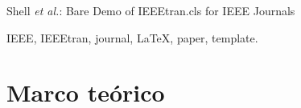 \documentclass[journal]{IEEEtran}
\begin{document}
%
{Shell \MakeLowercase{\textit{et al.}}: Bare Demo of IEEEtran.cls for IEEE Journals}
% 











\maketitle

\begin{abstract}
The abstract goes here.
\end{abstract}

\begin{IEEEkeywords}
IEEE, IEEEtran, journal, \LaTeX, paper, template.
\end{IEEEkeywords}






%
\IEEEpeerreviewmaketitle



\section{Marco teórico}
% 
% 
% 
\end{document}
